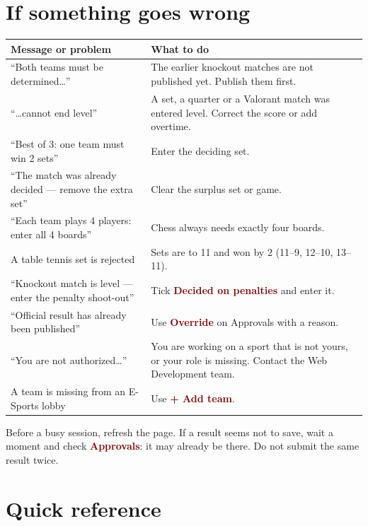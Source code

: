 \documentclass[11pt,a4paper]{article}
\newcommand{\ui}[1]{\textbf{\textcolor{maroon}{#1}}}
\begin{document}
\section{If something goes wrong}

\begin{center}
\begin{tabularx}{\textwidth}{@{}>{\raggedright\arraybackslash}p{5.2cm}X@{}}
\toprule
\textbf{Message or problem} & \textbf{What to do}\\
\midrule
``Both teams must be determined\ldots'' & The earlier knockout matches are not published yet. Publish them first.\\
``\ldots cannot end level'' & A set, a quarter or a Valorant match was entered level. Correct the score or add overtime.\\
``Best of 3: one team must win 2 sets'' & Enter the deciding set.\\
``The match was already decided --- remove the extra set'' & Clear the surplus set or game.\\
``Each team plays 4 players: enter all 4 boards'' & Chess always needs exactly four boards.\\
A table tennis set is rejected & Sets are to 11 and won by 2 (11--9, 12--10, 13--11).\\
``Knockout match is level --- enter the penalty shoot-out'' & Tick \ui{Decided on penalties} and enter it.\\
``Official result has already been published'' & Use \ui{Override} on Approvals with a reason.\\
``You are not authorized\ldots'' & You are working on a sport that is not yours, or your role is missing. Contact the Web Development team.\\
A team is missing from an E-Sports lobby & Use \ui{+ Add team}.\\
\bottomrule
\end{tabularx}
\end{center}

\begin{tip}
Before a busy session, refresh the page. If a result seems not to save, wait a moment and check \ui{Approvals}: it may already be there.
Do not submit the same result twice.
\end{tip}

\section{Quick reference}
\end{document}
